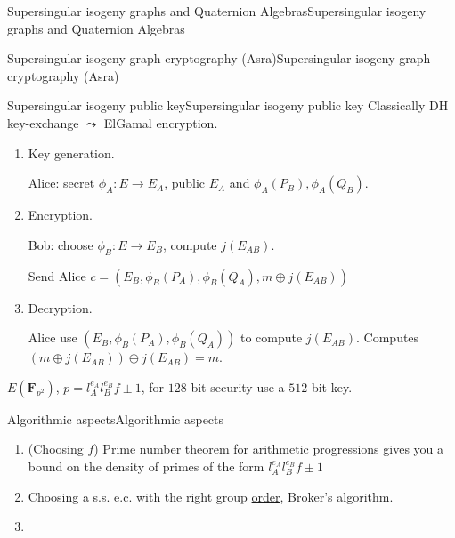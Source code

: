 \documentclass[10pt,]{book}
\numberwithin{equation}{section}
\newcommand{\FF}{\mathbf{F}}
\begin{document}
\begin{chapterptx}{Supersingular isogeny graphs and Quaternion Algebras}{}{Supersingular isogeny graphs and Quaternion Algebras}{}{}
\begin{sectionptx}{Supersingular isogeny graph cryptography (Asra)}{}{Supersingular isogeny graph cryptography (Asra)}{}{}
%
%
\typeout{************************************************}
\typeout{************************************************}
%
\begin{subsectionptx}{Supersingular isogeny public key}{}{Supersingular isogeny public key}{}{}\label{subsection-72}
\hypertarget{p-853}{}%
Classically DH key-exchange \(\leadsto\) ElGamal encryption.%
\par
\hypertarget{p-854}{}%
\leavevmode%
\begin{enumerate}
\item\hypertarget{li-215}{}\hypertarget{p-855}{}%
Key generation.%
\par
\hypertarget{p-856}{}%
Alice: secret \(\phi_A \colon E \to E_A\), public \(E_A\) and \(\phi_A(P_B), \phi_A(Q_B)\).%
\item\hypertarget{li-216}{}\hypertarget{p-857}{}%
Encryption.%
\par
\hypertarget{p-858}{}%
Bob: choose \(\phi_B \colon E \to E_B\), compute \(j(E_{AB})\).%
\par
\hypertarget{p-859}{}%
Send Alice \(c = (E_B, \phi_B(P_A), \phi_B(Q_A), m\oplus j(E_{AB}))\)%
\item\hypertarget{li-217}{}\hypertarget{p-860}{}%
Decryption.%
\par
\hypertarget{p-861}{}%
Alice use \((E_B, \phi_B(P_A), \phi_B(Q_A))\) to compute \(j(E_{AB})\). Computes \((m\oplus j(E_{AB})) \oplus j(E_{AB}) = m\).%
\end{enumerate}
%
\par
\hypertarget{p-862}{}%
\(E(\FF_{p^2})\), \(p = l_A^{e_A} l_B^{e_B} f \pm 1\), for \(128\)-bit security use a \(512\)-bit key.%
\end{subsectionptx}
%
%
\typeout{************************************************}
\typeout{************************************************}
%
\begin{subsectionptx}{Algorithmic aspects}{}{Algorithmic aspects}{}{}\label{subsection-73}
\hypertarget{p-863}{}%
\leavevmode%
\begin{enumerate}
\item\hypertarget{li-218}{}(Choosing \(f\)) Prime number theorem for arithmetic progressions gives you a bound on the density of primes of the form \(l_A^{e_A} l_B^{e_B} f \pm 1\)%
\item\hypertarget{li-219}{}Choosing a s.s. e.c. with the right group \hyperref[def-order-quaternion]{order}, Broker's algorithm.%
\item\hypertarget{li-220}{}\hypertarget{p-864}{}%

\end{enumerate}
\end{subsectionptx}
\end{sectionptx}
\end{chapterptx}
\end{document}
